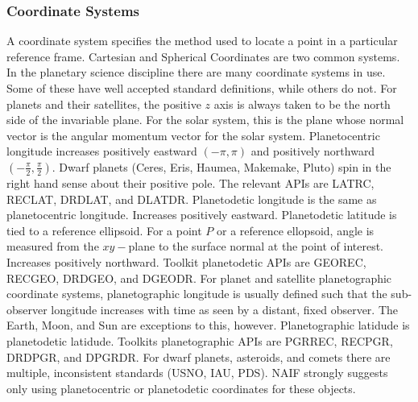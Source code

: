\documentclass[crop=false,class=book]{standalone}
\begin{document}
            \subsubsection{Coordinate Systems}
            A coordinate system specifies the method used to locate a point in a particular reference frame. Cartesian and Spherical Coordinates are two common systems. In the planetary science discipline there are many coordinate systems in use. Some of these have well accepted standard definitions, while others do not. For planets and their satellites, the positive $z$ axis is always taken to be the north side of the invariable plane. For the solar system, this is the plane whose normal vector is the angular momentum vector for the solar system. Planetocentric longitude increases positively eastward $(-\pi, \pi)$ and positively northward $(-\frac{\pi}{2},\frac{\pi}{2})$. Dwarf planets (Ceres, Eris, Haumea, Makemake, Pluto) spin in the right hand sense about their positive pole. The relevant APIs are LATRC, RECLAT, DRDLAT, and DLATDR. Planetodetic longitude is the same as planetocentric longitude. Increases positively eastward. Planetodetic latitude is tied to a reference ellipsoid. For a point $P$ or a reference ellopsoid, angle is measured from the $xy-$plane to the surface normal at the point of interest. Increases positively northward. Toolkit planetodetic APIs are GEOREC, RECGEO, DRDGEO, and DGEODR. For planet and satellite planetographic coordinate systems, planetographic longitude is usually defined such that the sub-observer longitude increases with time as seen by a distant, fixed observer. The Earth, Moon, and Sun are exceptions to this, however. Planetographic latidude is planetodetic latidude. Toolkits planetographic APIs are PGRREC, RECPGR, DRDPGR, and DPGRDR. For dwarf planets, asteroids, and comets there are multiple, inconsistent standards (USNO, IAU, PDS). NAIF strongly suggests only using planetocentric or planetodetic coordinates for these objects. 
\end{document}
